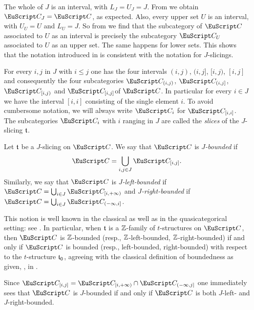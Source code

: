 \begin{remark}
The whole of $J$ is an interval, with $L_J=U_J=J$. From \adef{} we obtain $\C_J=\C$, as expected. Also, every upper set $U$ is an interval, with $U_U=U$ and $L_U=J$. So from  \adef{} we find that the subcategory of $\C$ associated to $U$ as an interval is precisely the subcategory $\C_U$ associated to $U$ as an upper set. The same happens for lower sets. This shows that the notation introduced in  \adef{} is consistent with the notation for $J$-slicings.
\end{remark}


\begin{example}\label{Ci}
For every $i,j$ in $J$ with $i\leq j$ one has the four intervals $(i,j)$, $(i,j]$, $[i,j)$, $[i,j]$ and consequently the four subcategories $\C_{(i,j)}$, $\C_{(i,j]}$, $\C_{[i,j)}$ and $\C_{[i,j]}$of $\C$. In particular for every $i\in J$ we have the interval $[i,i]$ consisting of the single element $i$. To avoid cumbersome notation, we will always write $\C_i$ for $\C_{[i,i]}$. The subcategories $\C_i$ with $i$ ranging in $J$ are called the \emph{slices} of the $J$-slicing $\mathfrak{t}$.
\end{example}

\begin{definition}\label{def.bounded}
Let $\mathfrak{t}$ be a $J$-slicing on $\C$. We say that $\C$ is \emph{$J$-bounded} if 
\[
\C=\bigcup_{i,j\in J}\C_{[i,j]}.
\]
Similarly, we say that $\C$ is \emph{$J$-left-bounded} if $\C=\bigcup_{i\in J}\C_{[i,+\infty)}$ and \emph{$J$-right-bounded} if $\C=\bigcup_{i\in J}\C_{(-\infty,i]}$. \end{definition}
\begin{remark}
This notion is well known in the classical as well as in the quasicategorical setting: see \cite{BBDPervers,LurieHA}. In particular, when $\mathfrak{t}$ is a $\mathbb{Z} $-family of $t$-structures on $\C$,  then $\C$ is $\mathbb{Z} $-bounded (resp., $\mathbb{Z} $-left-bounded, $\mathbb{Z} $-right-bounded) if and only if $\C$ is bounded (resp., left-bounded, right-bounded) with respect to the $t$-structure $\mathfrak{t}_0$, agreeing with the classical definition of boundedness as given, \eg, in \cite{BBDPervers}.
\end{remark}
\begin{remark}
Since $\C_{[i,j]}=\C_{[i,+\infty)}\cap \C_{(-\infty,j]}$ one immediately sees that $\C$ is $J$-bounded if and only if $\C$ is both $J$-left- and $J$-right-bounded.
\end{remark}

